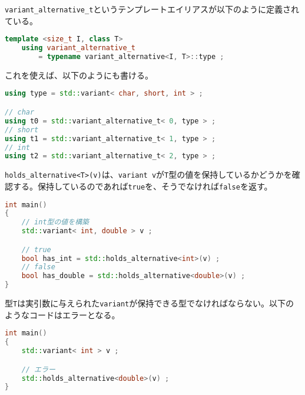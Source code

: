 \lstinline!variant_alternative_t!というテンプレートエイリアスが以下のように定義されている。

\begin{lstlisting}[language=C++]
template <size_t I, class T>
    using variant_alternative_t 
        = typename variant_alternative<I, T>::type ;
\end{lstlisting}

これを使えば、以下のようにも書ける。

\begin{lstlisting}[language=C++]
using type = std::variant< char, short, int > ;

// char
using t0 = std::variant_alternative_t< 0, type > ;
// short
using t1 = std::variant_alternative_t< 1, type > ;
// int
using t2 = std::variant_alternative_t< 2, type > ;
\end{lstlisting}

%

\lstinline!holds_alternative<T>(v)!は、\lstinline!variant v!が\lstinline!T!型の値を保持しているかどうかを確認する。保持しているのであれば\lstinline!true!を、そうでなければ\lstinline!false!を返す。

\begin{lstlisting}[language=C++]
int main()
{
    // int型の値を構築
    std::variant< int, double > v ;

    // true
    bool has_int = std::holds_alternative<int>(v) ;
    // false
    bool has_double = std::holds_alternative<double>(v) ;
}
\end{lstlisting}

型\lstinline!T!は実引数に与えられた\lstinline!variant!が保持できる型でなければならない。以下のようなコードはエラーとなる。

\begin{lstlisting}[language=C++]
int main()
{
    std::variant< int > v ;

    // エラー
    std::holds_alternative<double>(v) ;
}
\end{lstlisting}

%

